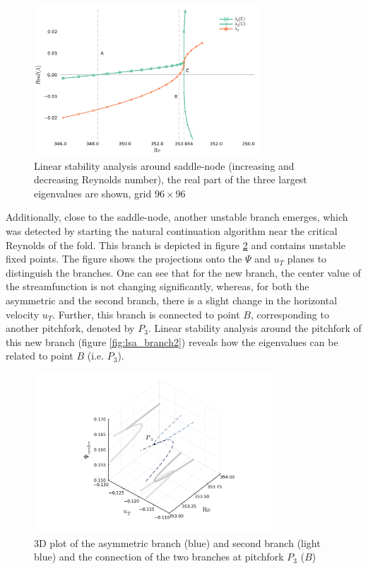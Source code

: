 \begin{figure}[h]
  \centering
  \includegraphics[width=0.75\textwidth]{figs/lsa_sn96x96.pdf}
  \caption{Linear stability analysis around saddle-node (increasing and
    decreasing Reynolds number), the real part of the three largest eigenvalues
    are shown, grid $96 \times 96$} 
  \label{fig:lsa}
\end{figure}

Additionally, close to the saddle-node, another unstable branch emerges, which
was detected by starting the natural continuation algorithm near the critical
Reynolds of the fold. This branch is depicted in figure \ref{fig:branch2} and
contains unstable fixed points. The figure shows the projections onto the
$\Psi$ and $u_T$ planes to distinguish the branches. One can see that for the
new branch, the center value of the streamfunction is not changing
significantly, whereas, for both the asymmetric and the second branch, there is
a slight change in the horizontal velocity $u_T$. Further, this branch is
connected to point $B$, corresponding to another pitchfork, denoted by $P_3$.
Linear stability analysis around the pitchfork of this new branch (figure
\ref{fig:lsa_branch2}) reveals how the eigenvalues can be related to point $B$
(i.e. $P_3$).

\begin{figure}[h!]
  \centering
  \includegraphics[trim={0 0.8cm 0 0.5cm},clip,width=0.8\textwidth]{figs/branch2_64x64.pdf}
  \caption{3D plot of the asymmetric branch (blue) and second branch (light blue) and the
    connection of the two branches at pitchfork $P_3$ ($B$)}
  \label{fig:branch2}
\end{figure}

